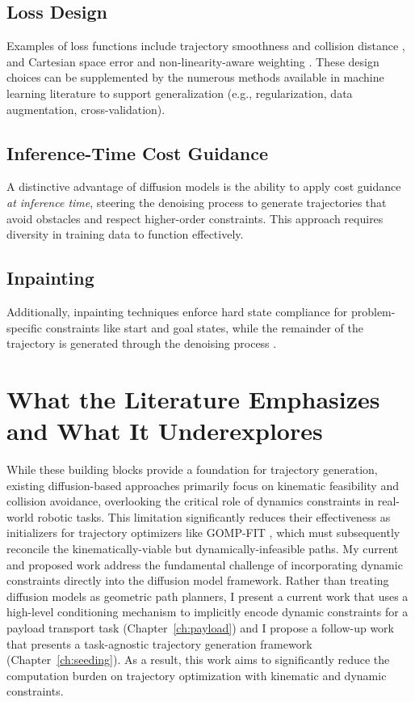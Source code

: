 \subsection{Loss Design}
\label{sec:generation:loss}

Examples of loss functions include trajectory smoothness and collision distance \cite{seo2024presto}, and Cartesian space error and non-linearity-aware weighting \cite{huang2024diffusionseeder}. These design choices can be supplemented by the numerous methods available in machine learning literature to support generalization (e.g., regularization, data augmentation, cross-validation).

\subsection{Inference-Time Cost Guidance}
\label{sec:generation:guidance}

A distinctive advantage of diffusion models is the ability to apply cost guidance \textsl{at inference time}, steering the denoising process to generate trajectories that avoid obstacles and respect higher-order constraints. This approach requires diversity in training data to function effectively.

\subsection{Inpainting}
\label{sec:generation:inpainting}

Additionally, inpainting techniques enforce hard state compliance for problem-specific constraints like start and goal states, while the remainder of the trajectory is generated through the denoising process \cite{janner2022planning,saha2024edmp,carvalho2023motion}.

\section{What the Literature Emphasizes and What It Underexplores}
\label{sec:generation:gap}

While these building blocks provide a foundation for trajectory generation, existing diffusion-based approaches primarily focus on kinematic feasibility and collision avoidance, overlooking the critical role of dynamics constraints in real-world robotic tasks. This limitation significantly reduces their effectiveness as initializers for trajectory optimizers like GOMP-FIT \cite{ichnowski2022gomp}, which must subsequently reconcile the kinematically-viable but dynamically-infeasible paths.
My current and proposed work address the fundamental challenge of incorporating dynamic constraints directly into the diffusion model framework. Rather than treating diffusion models as geometric path planners, I present a current work that uses a high-level conditioning mechanism to implicitly encode dynamic constraints for a payload transport task (Chapter~\ref{ch:payload}) and I propose a follow-up work that presents a task-agnostic trajectory generation framework (Chapter~\ref{ch:seeding}).
As a result, this work aims to significantly reduce the computation burden on trajectory optimization with kinematic and dynamic constraints.
